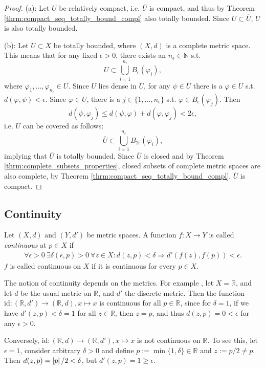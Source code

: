 \begin{proof}
	(a): Let $U$ be relatively compact, i.e. $\overline{U}$ is compact, and thus by Theorem \ref{thrm:compact_seq_totally_bound_compl} also totally bounded. Since $U\subset \overline{U}$, $U$ is also totally bounded.
	
	(b): Let $U\subset X$ be totally bounded, where $(X, d)$ is a complete metric space. This means that for any fixed $\epsilon > 0$, there exists an $n_{\epsilon}\in\mathbb N$ s.t.
	$$U\subset \bigcup_{i=1}^{n_{\epsilon}}B_{\epsilon}(\varphi_i),$$
	where $\varphi_1, \dots, \varphi_{n_{\epsilon}}\in U$. Since $U$ lies dense in $\overline{U}$, for any $\psi\in\overline{U}$ there is a $\varphi\in U$ s.t. $d(\varphi, \psi) < \epsilon$. Since $\varphi\in U$, there is a $j\in\{1, \dots, n_{\epsilon}\}$ s.t. $\varphi\in B_{\epsilon}(\varphi_j)$. Then
	$$d(\psi, \varphi_j) \leq d(\psi, \varphi) + d(\varphi, \varphi_j) < 2\epsilon,$$
	i.e. $\overline{U}$ can be covered as follows:
	$$\overline{U}\subset \bigcup_{i=1}^{n_{\epsilon}}B_{2\epsilon}(\varphi_i),$$ implying that $\overline{U}$ is totally bounded. Since $\overline{U}$ is closed and by Theorem \ref{thrm:complete_subsets_properties}, closed subsets of complete metric spaces are also complete, by Theorem \ref{thrm:compact_seq_totally_bound_compl}, $\overline{U}$ is compact.
\end{proof}

\newpage 
\subsection{Continuity}
\begin{defn}\label{defn:continuity}
	Let $(X, d)$ and $(Y, d')$ be metric spaces. A function $f: X\rightarrow Y$ is called \textit{continuous} at $p\in X$ if 
	\begin{align}
		\forall \epsilon > 0\ \exists \delta(\epsilon, p) > 0\ \forall z\in X: d\left(z, p\right) < \delta \Rightarrow d'\left( f\left(z\right), f\left(p\right) \right) < \epsilon.  
	\end{align}
	$f$ is called continuous on $X$ if it is continuous for every $p\in X$.
\end{defn}

\begin{remark}
	The notion of continuity depends on the metrics. For example \cite{2087322}, let $X = \mathbb R$, and let $d$ be the usual metric on $\mathbb R$, and $d'$ the discrete metric. Then the function $\text{id}: (\mathbb R, d') \to (\mathbb R, d), x\mapsto x$ is continuous for all $p\in \mathbb R$, since for $\delta = 1$, if we have $d'(z, p) < \delta = 1$ for all $z\in\mathbb R$, then $z = p$, and thus $d(z, p) = 0 < \epsilon$ for any $\epsilon > 0$.
	
	Conversely, $\text{id}: (\mathbb R, d) \to (\mathbb R, d'), x\mapsto x$ is not continuous on $\mathbb R$. To see this, let $\epsilon = 1$, consider arbitrary $\delta > 0$ and define $p := \min\{1, \delta\}\in\mathbb R$ and $z := p/2\ne p$. Then $d(z, p) = \left\vert p \right\vert/2 < \delta$, but $d'(z, p) = 1 \geq \epsilon$.
\end{remark}

